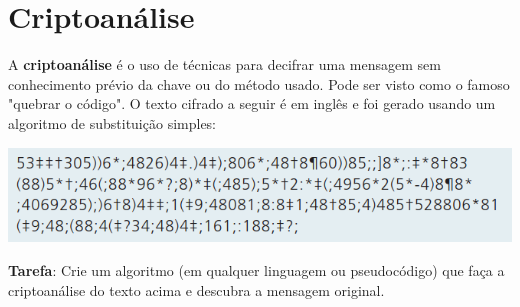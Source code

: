 \section{Criptoanálise}
A \textbf{criptoanálise} é o uso de técnicas para decifrar uma mensagem sem conhecimento prévio da chave ou do método usado. Pode ser visto como o famoso "quebrar o código". O texto cifrado a seguir é em inglês e foi gerado usando um algoritmo de substituição simples:

\includegraphics[width=\linewidth]{Figuras/cripto-msg.png}

\textbf{Tarefa}: Crie um algoritmo (em qualquer linguagem ou pseudocódigo) que faça a criptoanálise do texto acima e descubra a mensagem original. 



